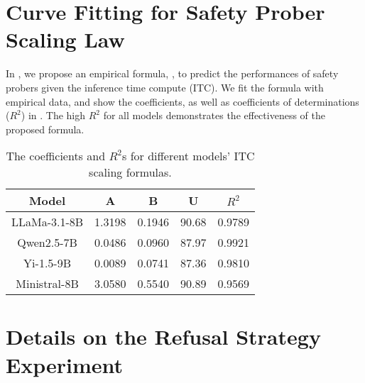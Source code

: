 \section{Curve Fitting for Safety Prober Scaling Law}
\label{app:scaling}
In , we propose an empirical formula, , to predict the performances of safety probers given the inference time compute (ITC). We fit the formula with empirical data, and show the coefficients, as well as coefficients of determinations ($R^2$) in . The high $R^2$ for all models demonstrates the effectiveness of the proposed formula.

\begin{table}[]
\caption{The coefficients and $R^2$s for different models' ITC scaling formulas.}\label{table:fit_curve}
\vspace{2mm}
\centering
\renewcommand{\arraystretch}{1.1}
\begin{tabular}{ccccc}
\hline
\multicolumn{1}{c}{\textbf{Model}} & \multicolumn{1}{c}{A} & B & U & $R^2$ \\ \hline
LLaMa-3.1-8B                       & 1.3198                         & 0.1946     & 90.68      & 0.9789         \\
Qwen2.5-7B                         & 0.0486                         & 0.0960     & 87.97      & 0.9921         \\
Yi-1.5-9B                          & 0.0089                         & 0.0741     & 87.36      & 0.9810         \\
Ministral-8B                       & 3.0580                         & 0.5540     & 90.89      & 0.9569\\ \hline
\end{tabular}
\end{table}



\section{Details on the Refusal Strategy Experiment}
\label{app:refusal}



